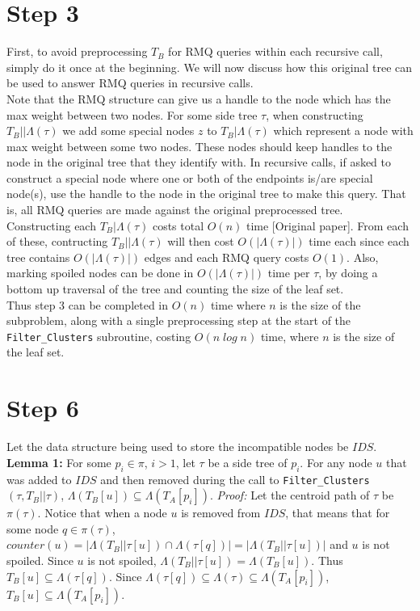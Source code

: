 \documentclass[a4paper]{article}
\begin{document}
    \section{Step 3}

    First, to avoid preprocessing $T_B$ for RMQ queries within each recursive call, simply do it once at the beginning. We will now discuss how this original tree can be used to answer RMQ queries in recursive calls.\\

    Note that the RMQ structure can give us a handle to the node which has the max weight between two nodes. For some side tree $\tau$, when constructing $T_B||\Lambda(\tau)$ we add some special nodes $z$ to $T_B|\Lambda(\tau)$ which represent a node with max weight between some two nodes. These nodes should keep handles to the node in the original tree that they identify with. In recursive calls, if asked to construct a special node where one or both of the endpoints is/are special node(s), use the handle to the node in the original tree to make this query. That is, all RMQ queries are made against the original preprocessed tree.\\

    Constructing each $T_B|\Lambda(\tau)$ costs total $O(n)$ time [Original paper]. From each of these, contructing $T_B||\Lambda(\tau)$ will then cost $O(|\Lambda(\tau)|)$ time each since each tree contains $O(|\Lambda(\tau)|)$ edges and each RMQ query costs $O(1)$. Also, marking spoiled nodes can be done in $O(|\Lambda(\tau)|)$ time per $\tau$, by doing a bottom up traversal of the tree and counting the size of the leaf set.\\

    Thus step 3 can be completed in $O(n)$ time where $n$ is the size of the subproblem, along with a single preprocessing step at the start of the \texttt{Filter\_Clusters} subroutine, costing $O(n\;log\;n)$ time, where $n$ is the size of the leaf set.

    \section{Step 6}

    Let the data structure being used to store the incompatible nodes be $IDS$.\\

    \textbf{Lemma 1:} For some $p_i \in \pi$, $i > 1$, let $\tau$ be a side tree of $p_i$. For any node $u$ that was added to $IDS$ and then removed during the call to \texttt{Filter\_Clusters}$(\tau, T_B||\tau)$, $\Lambda(T_B[u]) \subseteq \Lambda(T_A[p_i])$.
    \textit{Proof:} Let the centroid path of $\tau$ be $\pi(\tau)$. Notice that when a node $u$ is removed from $IDS$, that means that for some node $q \in \pi(\tau)$, $counter(u) = |\Lambda(T_B||\tau[u]) \cap \Lambda(\tau[q])| = |\Lambda(T_B||\tau[u])|$ and $u$ is not spoiled. Since $u$ is not spoiled, $\Lambda(T_B||\tau[u]) = \Lambda(T_B[u])$. Thus $T_B[u] \subseteq \Lambda(\tau[q])$. Since $\Lambda(\tau[q]) \subseteq \Lambda(\tau) \subseteq \Lambda(T_A[p_i])$, $T_B[u] \subseteq \Lambda(T_A[p_i])$.\\
\end{document}
